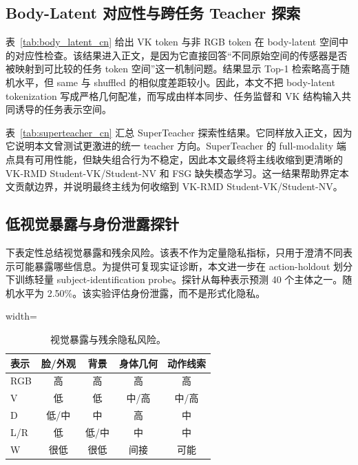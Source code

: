 ﻿\documentclass[UTF8,twocolumn]{ctexart}
\begin{document}
\subsection{Body-Latent 对应性与跨任务 Teacher 探索}
表~\ref{tab:body_latent_cn} 给出 VK token 与非 RGB token 在 body-latent 空间中的对应性检查。该结果进入正文，是因为它直接回答“不同原始空间的传感器是否被映射到可比较的任务 token 空间”这一机制问题。结果显示 Top-1 检索略高于随机水平，但 same 与 shuffled 的相似度差距较小。因此，本文不把 body-latent tokenization 写成严格几何配准，而写成由样本同步、任务监督和 VK 结构输入共同诱导的任务表示空间。



表~\ref{tab:superteacher_cn} 汇总 SuperTeacher 探索性结果。它同样放入正文，因为它说明本文曾测试更激进的统一 teacher 方向。SuperTeacher 的 full-modality 端点具有可用性能，但缺失组合行为不稳定，因此本文最终将主线收缩到更清晰的 VK-RMD Student-VK/Student-NV 和 FSG 缺失模态学习。这一结果帮助界定本文贡献边界，并说明最终主线为何收缩到 VK-RMD Student-VK/Student-NV。



\subsection{低视觉暴露与身份泄露探针}
下表定性总结视觉暴露和残余风险。该表不作为定量隐私指标，只用于澄清不同表示可能暴露哪些信息。为提供可复现实证诊断，本文进一步在 action-holdout 划分下训练轻量 subject-identification probe。探针从每种表示预测 40 个主体之一。随机水平为 2.50\%。该实验评估身份泄露，而不是形式化隐私。

\begin{table}[t]
\centering
\caption{视觉暴露与残余隐私风险。}
\label{tab:privacy}
\begin{adjustbox}{width=\linewidth}
\begin{tabular}{lcccc}
\toprule
表示 & 脸/外观 & 背景 & 身体几何 & 动作线索 \\
\midrule
RGB & 高 & 高 & 高 & 高 \\
V & 低 & 低 & 中/高 & 中/高 \\
D & 低/中 & 中 & 高 & 中 \\
L/R & 低 & 低/中 & 中 & 中 \\
W & 很低 & 很低 & 间接 & 可能 \\
\bottomrule
\end{tabular}
\end{adjustbox}
\end{table}
\end{document}
